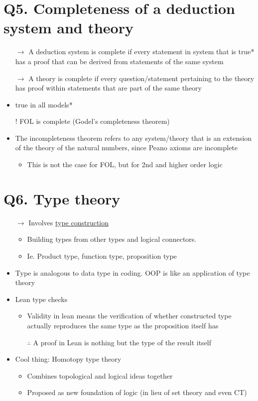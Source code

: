\documentclass{article}
\begin{document}
\section*{Q5. Completeness of a deduction system and theory}
\begin{itemize}
  \item[$\rightarrow$] A deduction system is complete if every statement in system that is true* has a proof that can be derived from statements of the same system
  \item[$\rightarrow$] A theory is complete if every question/statement pertaining to the theory has proof within statements that are part of the same theory
  \item true in all models*
  \vspace{4mm} 
  \item[!] FOL is complete (Godel’s completeness theorem)
  \item The incompleteness theorem refers to any system/theory that is an extension of the theory of the natural numbers, since Peano axioms are incomplete
  \begin{itemize}
    \item This is not the case for FOL, but for 2nd and higher order logic
  \end{itemize}
\end{itemize}

\section*{Q6. Type theory}
\begin{itemize}
  \item[$\rightarrow$] Involves \underline{type construction}
  \begin{itemize}
    \item Building types from other types and logical connectors.
    \item Ie. Product type, function type, proposition type
  \end{itemize}
  \item Type is analogous to data type in coding. OOP is like an application of type theory
  \vspace{4mm} 
  \item Lean type checks
  \begin{itemize}
    \item Validity in lean means the verification of whether constructed type actually reproduces the same type as the proposition itself has
    \item[$\therefore$] A proof in Lean is nothing but the type of the result itself
  \end{itemize}
  \vspace{4mm} 
  \item Cool thing: Homotopy type theory
  \begin{itemize}
    \item Combines topological and logical ideas together
    \item Proposed as new foundation of logic (in lieu of set theory and even CT)
  \end{itemize}
\end{itemize}
\end{document}
